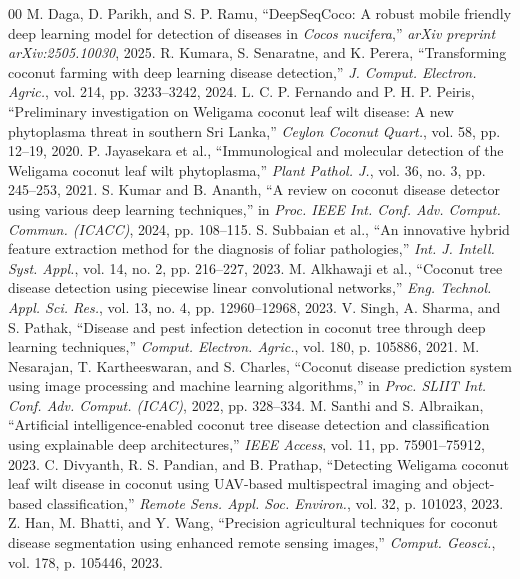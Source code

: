 \documentclass[conference,a4paper]{IEEEtran}
\begin{document}
\begin{thebibliography}{00}
 M. Daga, D. Parikh, and S. P. Ramu, ``DeepSeqCoco: A robust mobile friendly deep learning model for detection of diseases in \textit{Cocos nucifera},'' \textit{arXiv preprint arXiv:2505.10030}, 2025.
 R. Kumara, S. Senaratne, and K. Perera, ``Transforming coconut farming with deep learning disease detection,'' \textit{J. Comput. Electron. Agric.}, vol. 214, pp. 3233--3242, 2024.
 L. C. P. Fernando and P. H. P. Peiris, ``Preliminary investigation on Weligama coconut leaf wilt disease: A new phytoplasma threat in southern Sri Lanka,'' \textit{Ceylon Coconut Quart.}, vol. 58, pp. 12--19, 2020.
 P. Jayasekara et al., ``Immunological and molecular detection of the Weligama coconut leaf wilt phytoplasma,'' \textit{Plant Pathol. J.}, vol. 36, no. 3, pp. 245--253, 2021.
 S. Kumar and B. Ananth, ``A review on coconut disease detector using various deep learning techniques,'' in \textit{Proc. IEEE Int. Conf. Adv. Comput. Commun. (ICACC)}, 2024, pp. 108--115.
 S. Subbaian et al., ``An innovative hybrid feature extraction method for the diagnosis of foliar pathologies,'' \textit{Int. J. Intell. Syst. Appl.}, vol. 14, no. 2, pp. 216--227, 2023.
 M. Alkhawaji et al., ``Coconut tree disease detection using piecewise linear convolutional networks,'' \textit{Eng. Technol. Appl. Sci. Res.}, vol. 13, no. 4, pp. 12960--12968, 2023.
 V. Singh, A. Sharma, and S. Pathak, ``Disease and pest infection detection in coconut tree through deep learning techniques,'' \textit{Comput. Electron. Agric.}, vol. 180, p. 105886, 2021.
 M. Nesarajan, T. Kartheeswaran, and S. Charles, ``Coconut disease prediction system using image processing and machine learning algorithms,'' in \textit{Proc. SLIIT Int. Conf. Adv. Comput. (ICAC)}, 2022, pp. 328--334.
 M. Santhi and S. Albraikan, ``Artificial intelligence-enabled coconut tree disease detection and classification using explainable deep architectures,'' \textit{IEEE Access}, vol. 11, pp. 75901--75912, 2023.
 C. Divyanth, R. S. Pandian, and B. Prathap, ``Detecting Weligama coconut leaf wilt disease in coconut using UAV-based multispectral imaging and object-based classification,'' \textit{Remote Sens. Appl. Soc. Environ.}, vol. 32, p. 101023, 2023.
 Z. Han, M. Bhatti, and Y. Wang, ``Precision agricultural techniques for coconut disease segmentation using enhanced remote sensing images,'' \textit{Comput. Geosci.}, vol. 178, p. 105446, 2023.

\end{thebibliography}
\end{document}
